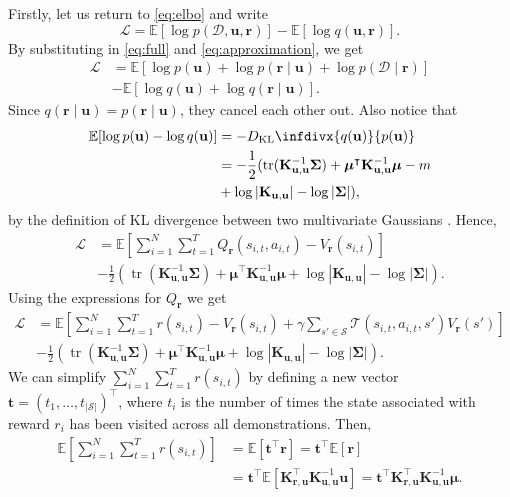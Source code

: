 \documentclass{mpaper}
\DeclareMathOperator{\tr}{tr}
\newcommand{\DKL}{D_{\mathrm{KL}}\infdivx}
\newcommand{\V}{V_{\mathbf{r}}}
\newcommand{\Kuu}{\mathbf{K}_{\mathbf{u},\mathbf{u}}}
\newcommand{\Kru}{\mathbf{K}_{\mathbf{r},\mathbf{u}}}
\newcommand{\pfull}{p(\mathcal{D}, \mathbf{u}, \mathbf{r})}
\newcommand{\approximation}{q(\mathbf{u}, \mathbf{r})}
\begin{document}
Firstly, let us return to \eqref{eq:elbo} and write
\[
  \mathcal{L} = \mathbb{E}[\log\pfull] - \mathbb{E}[\log\approximation].
\]
By substituting in \eqref{eq:full} and \eqref{eq:approximation}, we get
\begin{align*}
  \mathcal{L} &= \mathbb{E}[\log p(\mathbf{u}) + \log p(\mathbf{r} \mid \mathbf{u}) + \log p(\mathcal{D} \mid \mathbf{r})] \\
              &- \mathbb{E}[\log q(\mathbf{u}) + \log q(\mathbf{r} \mid \mathbf{u})].
\end{align*}
Since $q(\mathbf{r} \mid \mathbf{u}) = p(\mathbf{r} \mid \mathbf{u})$, they
cancel each other out. Also notice that
\begin{align*}
  \mathbb{E}[\log p(\mathbf{u}) - \log q(\mathbf{u})] &= -\DKL{q(\mathbf{u})}{p(\mathbf{u})} \\
                                                      &= -\frac{1}{2} (\tr (\Kuu^{-1}\bm\Sigma) + \bm\mu^\intercal\Kuu^{-1}\bm\mu - m \\
                                                      &+ \log |\Kuu| - \log |\bm\Sigma|),
\end{align*}
by the definition of KL divergence between two multivariate Gaussians
\cite{kl}. Hence,
\begin{align*}
  \mathcal{L} &= \mathbb{E}\left[ \sum_{i=1}^N \sum_{t=1}^T Q_{\mathbf{r}}(s_{i,t}, a_{i,t}) - \V(s_{i,t}) \right] \\
              &- \frac{1}{2} \left(\tr \left( \Kuu^{-1}\bm\Sigma \right) + \bm\mu^\intercal\Kuu^{-1}\bm\mu + \log |\Kuu| - \log |\bm\Sigma| \right).
\end{align*}
Using the expressions for $Q_{\mathbf{r}}$ we get
\begin{align*}
  \mathcal{L} &= \mathbb{E}\left[\sum_{i=1}^N \sum_{t=1}^T r(s_{i,t}) - \V(s_{i,t}) + \gamma\sum_{s' \in \mathcal{S}} \mathcal{T}(s_{i,t}, a_{i,t}, s')\V(s') \right] \\
              &- \frac{1}{2} \left(\tr \left( \Kuu^{-1}\bm\Sigma \right) + \bm\mu^\intercal\Kuu^{-1}\bm\mu + \log |\Kuu| - \log |\bm\Sigma| \right).
\end{align*}
We can simplify $\sum_{i=1}^N\sum_{t=1}^Tr(s_{i,t})$ by defining a new vector
$\mathbf{t} = (t_1, \dots, t_{|\mathcal{S}|})^\intercal$, where $t_i$ is the
number of times the state associated with reward $r_i$ has been visited
across all demonstrations. Then,
\begin{align*}
  \mathbb{E} \left[ \sum_{i=1}^N\sum_{t=1}^Tr(s_{i,t}) \right] &= \mathbb{E}[\mathbf{t}^\intercal\mathbf{r}] = \mathbf{t}^\intercal\mathbb{E}[\mathbf{r}] \\
                                                               &= \mathbf{t}^\intercal\mathbb{E}\left[\Kru^\intercal\Kuu^{-1}\mathbf{u}\right] = \mathbf{t}^\intercal\Kru^\intercal\Kuu^{-1}\bm\mu.
\end{align*}
\end{document}
